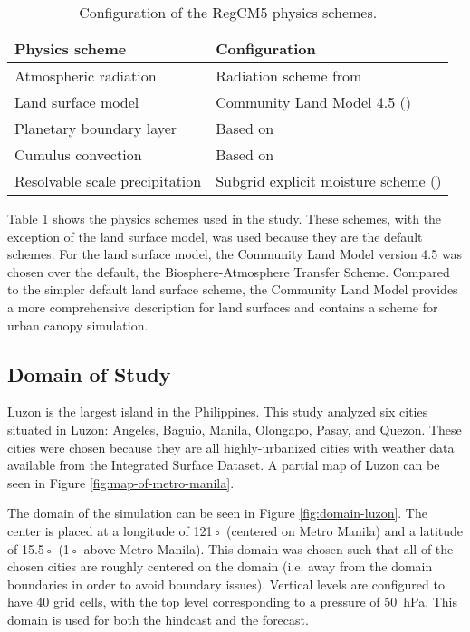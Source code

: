 	\begin{table}	
		\caption{Configuration of the RegCM5 physics schemes.}
		\label{tab:physics-schemes}
		\centering
		\begin{tabular}{l l}
			\hline \hline
			Physics scheme & Configuration\\
			\hline
			Atmospheric radiation & Radiation scheme from \textcite{Kiehl1996} \\
			Land surface model & Community Land Model 4.5 (\cite{Oleson2013})\\
			Planetary boundary layer & Based on \textcite{Holtslag1990}\\
			Cumulus convection & Based on \textcite{Emanuel1991}\\
			Resolvable scale precipitation & Subgrid explicit moisture scheme (\cite{Pal2000})\\
			\hline
		\end{tabular}		
	\end{table}
	
	Table \ref{tab:physics-schemes} shows the physics schemes used in the study.
	These schemes, with the exception of the land surface model, was used because they are the default schemes. 
	For the land surface model, the Community Land Model version 4.5 was chosen over the default, the Biosphere-Atmosphere Transfer Scheme. 
	Compared to the simpler default land surface scheme, the Community Land Model provides a more comprehensive description for land surfaces and contains a scheme for urban canopy simulation.
	
	\subsection{Domain of Study}
		Luzon is the largest island in the Philippines.
		This study analyzed six cities situated in Luzon:
		Angeles,
		Baguio,
		Manila,
		Olongapo,
		Pasay,
		and
		Quezon.
		These cities were chosen because they are all highly-urbanized cities with weather data available from the Integrated Surface Dataset.
		A partial map of Luzon can be seen in Figure \ref{fig:map-of-metro-manila}.
		
		The domain of the simulation can be seen in Figure \ref{fig:domain-luzon}.
		The center is placed at a longitude of 121◦ (centered on Metro Manila) and a latitude of 15.5◦ (1◦ above Metro Manila).
		This domain was chosen such that all of the chosen cities are roughly centered on the domain (i.e. away from the domain boundaries in order to avoid boundary issues).
		Vertical levels are configured to have 40 grid cells, with the top level corresponding to a pressure of \qty{50}{hPa}.
		This domain is used for both the hindcast and the forecast.
		
